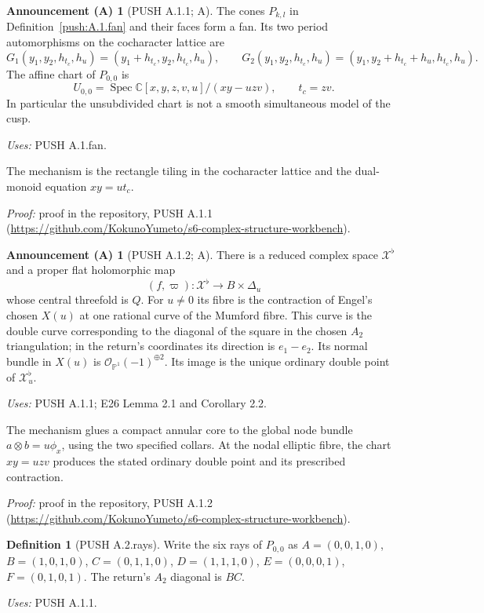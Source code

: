 \documentclass[11pt,a4paper]{article}
\theoremstyle{plain}
\theoremstyle{definition}
\newtheorem{announcement}[theorem]{Announcement (A)}
\newtheorem{definition}[theorem]{Definition}
\begin{document}
\begin{announcement}[PUSH A.1.1; A]\label{push:A.1.1}
The cones $P_{k,l}$ in Definition~\ref{push:A.1.fan} and their faces form a fan. Its two
period automorphisms on the cocharacter lattice are
\[
 G_1(y_1,y_2,h_{t_c},h_u)=(y_1+h_{t_c},y_2,h_{t_c},h_u),\qquad
 G_2(y_1,y_2,h_{t_c},h_u)=(y_1,y_2+h_{t_c}+h_u,h_{t_c},h_u).
\]
The affine chart of $P_{0,0}$ is
\[
 U_{0,0}=\operatorname{Spec}\mathbb C[x,y,z,v,u]/(xy-uzv),
 \qquad t_c=zv.
\]
In particular the unsubdivided chart is not a smooth simultaneous
model of the cusp.
\end{announcement}
\noindent\emph{Uses:} PUSH A.1.fan.\par

The mechanism is the rectangle tiling in the cocharacter lattice and the dual-monoid equation $xy=ut_c$.

\noindent\emph{Proof:} proof in the repository, PUSH A.1.1 (\url{https://github.com/KokunoYumeto/s6-complex-structure-workbench}).

\begin{announcement}[PUSH A.1.2; A]\label{push:A.1.2}
There is a reduced complex space $\mathcal X^\flat$ and a proper flat
holomorphic map
\[
 (f,\varpi):\mathcal X^\flat\longrightarrow B\times\Delta_u
\]
whose central threefold is $Q$. For $u\ne0$ its fibre is the
contraction of Engel's chosen $X(u)$ at one rational curve of the
Mumford fibre. This curve is the double curve corresponding to the
diagonal of the square in the chosen $A_2$ triangulation; in the
return's coordinates its direction is $e_1-e_2$. Its normal bundle
in $X(u)$ is $\mathcal O_{\mathbb P^1}(-1)^{\oplus2}$. Its image is
the unique ordinary double point of $\mathcal X^\flat_u$.
\end{announcement}
\noindent\emph{Uses:} PUSH A.1.1; E26 Lemma 2.1 and Corollary 2.2.\par

The mechanism glues a compact annular core to the global node bundle $a\otimes b=u\phi_x$, using the two specified collars. At the nodal elliptic fibre, the chart $xy=uzv$ produces the stated ordinary double point and its prescribed contraction.

\noindent\emph{Proof:} proof in the repository, PUSH A.1.2 (\url{https://github.com/KokunoYumeto/s6-complex-structure-workbench}).

\begin{definition}[PUSH A.2.rays]\label{push:A.2.rays}
Write the six rays of $P_{0,0}$ as
$A=(0,0,1,0)$, $B=(1,0,1,0)$, $C=(0,1,1,0)$,
$D=(1,1,1,0)$, $E=(0,0,0,1)$, $F=(0,1,0,1)$.
The return's $A_2$ diagonal is $BC$.
\end{definition}
\noindent\emph{Uses:} PUSH A.1.1.\par
\end{document}
